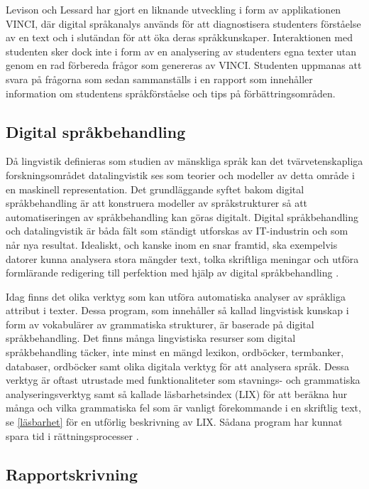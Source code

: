 \documentclass[swedish]{maucsthesis}
\begin{document}
Levison och Lessard \cite{levison:2004} har gjort en liknande utveckling i form av applikationen VINCI, där digital språkanalys används för att diagnostisera studenters förståelse av en text och i slutändan för att öka deras språkkunskaper. Interaktionen med studenten sker dock inte i form av en analysering av studenters egna texter utan genom en rad förbereda frågor som genereras av VINCI. Studenten uppmanas att svara på frågorna som sedan sammanställs i en rapport som innehåller information
om studentens språkförståelse och tips på förbättringsområden.

\subsection{Digital språkbehandling}\label{språkteknologi}

Då lingvistik definieras som studien av mänskliga språk kan det
tvärvetenskapliga forskningsområdet datalingvistik ses som teorier och modeller av detta område i en maskinell representation. Det
grundläggande syftet bakom digital språkbehandling är att konstruera modeller av
språkstrukturer så att automatiseringen av språkbehandling kan göras
digitalt. Digital språkbehandling och datalingvistik är båda fält som ständigt utforskas
av IT-industrin och som når nya resultat. Idealiskt, och kanske inom en snar
framtid, ska exempelvis datorer kunna analysera stora mängder text, tolka
skriftliga meningar och utföra formlärande redigering till perfektion med hjälp
av digital språkbehandling \cite{nugues:2014}.

Idag finns det olika verktyg som kan utföra automatiska analyser av språkliga
attribut i texter. Dessa program, som innehåller så kallad lingvistisk kunskap
i form av vokabulärer av grammatiska strukturer, är baserade på digital språkbehandling. Det finns många lingvistiska
resurser som digital språkbehandling täcker, inte minst en mängd lexikon, ordböcker,
termbanker, databaser, ordböcker samt olika digitala verktyg för att analysera
språk. Dessa verktyg är oftast utrustade med funktionaliteter som stavnings- och
grammatiska analyseringsverktyg samt så kallade läsbarhetsindex (LIX) för att beräkna hur många och vilka grammatiska fel som är vanligt förekommande i en skriftlig text, se \cref{läsbarhet} för en utförlig beskrivning av LIX. Sådana program har kunnat
spara tid i rättningsprocesser \cite{wengelin:2017}.

\subsection{Rapportskrivning}\label{rapportskrivning}
\end{document}
